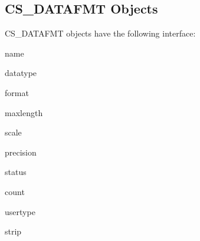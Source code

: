 \subsection{CS_DATAFMT Objects}

CS_DATAFMT objects have the following interface:

\begin{memberdesc}[CS_DATAFMT]{name}
\end{memberdesc}

\begin{memberdesc}[CS_DATAFMT]{datatype}
\end{memberdesc}

\begin{memberdesc}[CS_DATAFMT]{format}
\end{memberdesc}

\begin{memberdesc}[CS_DATAFMT]{maxlength}
\end{memberdesc}

\begin{memberdesc}[CS_DATAFMT]{scale}
\end{memberdesc}

\begin{memberdesc}[CS_DATAFMT]{precision}
\end{memberdesc}

\begin{memberdesc}[CS_DATAFMT]{status}
\end{memberdesc}

\begin{memberdesc}[CS_DATAFMT]{count}
\end{memberdesc}

\begin{memberdesc}[CS_DATAFMT]{usertype}
\end{memberdesc}

\begin{memberdesc}[CS_DATAFMT]{strip}
\end{memberdesc}
